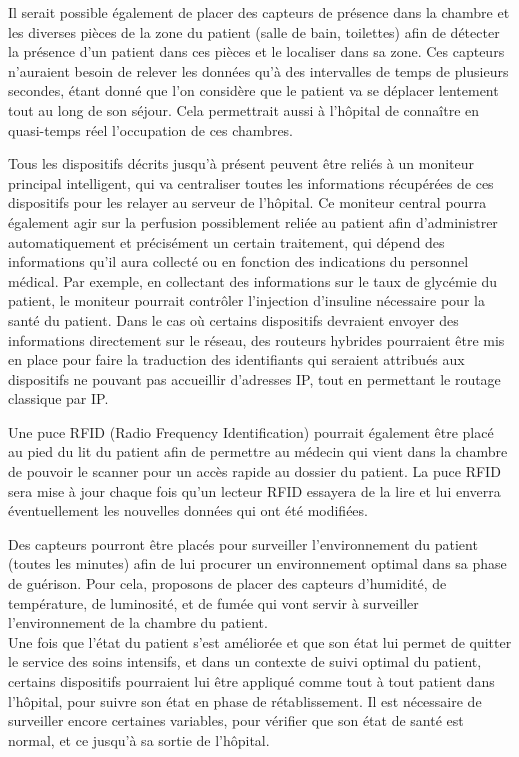 \documentclass{article}
\begin{document}
Il serait possible également de placer des capteurs de présence dans la chambre et les diverses pièces de la zone du patient (salle de bain, toilettes) afin de détecter la présence d’un patient dans ces pièces et le localiser dans sa zone. Ces capteurs n’auraient besoin de relever les données qu'à des intervalles de temps de plusieurs secondes, étant donné que l’on considère que le patient va se déplacer lentement tout au long de son séjour. Cela permettrait aussi à l’hôpital de connaître en quasi-temps réel l’occupation de ces chambres.

Tous les dispositifs décrits jusqu’à présent peuvent être reliés à un moniteur principal intelligent, qui va centraliser toutes les informations récupérées de ces dispositifs pour les relayer au serveur de l’hôpital. Ce moniteur central pourra également agir sur la perfusion possiblement reliée au patient afin d’administrer automatiquement et précisément un certain traitement, qui dépend des informations qu'il aura collecté ou en fonction des indications du personnel médical. Par exemple, en collectant des informations sur le taux de glycémie du patient, le moniteur pourrait contrôler l’injection d’insuline nécessaire pour la santé du patient. Dans le cas où certains dispositifs devraient envoyer des informations directement sur le réseau, des routeurs hybrides pourraient être mis en place pour faire la traduction des identifiants qui seraient attribués aux dispositifs ne pouvant pas accueillir d'adresses IP, tout en permettant le routage classique par IP.

Une puce RFID (Radio Frequency Identification) \cite{RFID} pourrait également être placé au pied du lit du patient  afin de permettre au médecin qui vient dans la chambre de pouvoir le scanner pour un accès rapide au dossier du patient. La puce RFID sera mise à jour chaque fois qu'un lecteur RFID essayera de la lire et lui enverra éventuellement les nouvelles données qui ont été modifiées.

Des capteurs pourront être placés pour surveiller l’environnement du patient (toutes les minutes) afin de lui procurer un environnement optimal dans sa phase de guérison. Pour cela, proposons de placer des capteurs d’humidité, de température, de luminosité, \cite{HTL} et de fumée qui vont servir à surveiller l'environnement de la chambre du patient. 
\\

Une fois que l'état du patient s'est améliorée et que son état lui permet de quitter le service des soins intensifs, et dans un contexte de suivi optimal du patient, certains dispositifs pourraient lui être appliqué comme tout à tout patient dans l'hôpital, pour suivre son état en phase de rétablissement. Il est nécessaire de surveiller encore certaines variables, pour vérifier que son état de santé est normal, et ce jusqu’à sa sortie de l’hôpital. 
\end{document}
